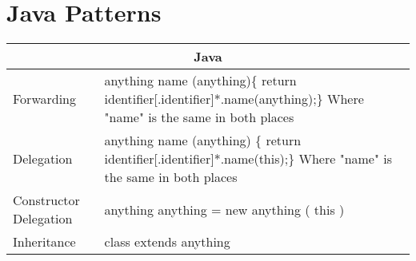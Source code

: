 \section{Java Patterns}
\begin{tabular}{|p{5cm}|p{9cm}|}
	\hline
	\multicolumn{2}{|c|}{Java}                                                                                                                                               \\ \hline
	Forwarding                     & anything name (anything)\{ \newline   return identifier{[}.identifier{]}*.name(anything);\newline \} \newline Where "name" is the same in both places \\ \hline
	Delegation                     & anything name (anything) \{ \newline   return identifier{[}.identifier{]}*.name(this);\newline \}  \newline Where "name" is the same in both places                    \\ \hline
	Constructor Delegation & anything anything = new anything ( this )                                                                                                  \\ \hline
	Inheritance                    & class extends anything                                                                                                                                         \\ \hline
\end{tabular}

